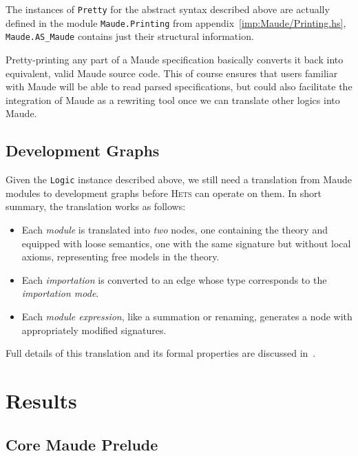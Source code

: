 \documentclass[11pt]{article}
\newcommand{\Hets}{\textsc{Hets}}
\begin{document}
The instances of \texttt{Pretty} for the abstract syntax described above are actually defined in the module \texttt{Maude.Printing} from appendix~\ref{imp:Maude/Printing.hs}, \texttt{Maude.AS\_Maude} contains just their structural information.

Pretty-printing any part of a Maude specification basically converts it back into equivalent, valid Maude source code. This of course ensures that users familiar with Maude will be able to read parsed specifications, but could also facilitate the integration of Maude as a rewriting tool once we can translate other logics into Maude.


\subsection{Development Graphs}
\label{sub:implementation_devgraph}

Given the \texttt{Logic} instance described above, we still need a translation from Maude modules to development graphs before \Hets{} can operate on them. In short summary, the translation works as follows:

\begin{itemize}
  \item Each \emph{module} is translated into \emph{two} nodes, one containing the theory and equipped with loose semantics, one with the same signature but without local axioms, representing free models in the theory.
  \item Each \emph{importation} is converted to an edge whose type corresponds to the \emph{importation mode}.
  \item Each \emph{module expression}, like a summation or renaming, generates a node with appropriately modified signatures.
\end{itemize}

Full details of this translation and its formal properties are discussed in~\cite{Codescu:2010}.


\clearpage
\section{Results} %
\label{sec:results}

\subsection{Core Maude Prelude}
\label{sub:results_prelude}
\end{document}
